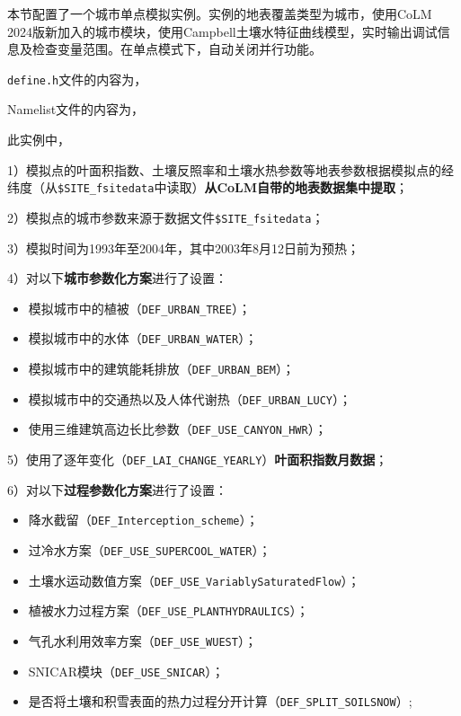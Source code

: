 本节配置了一个城市单点模拟实例。实例的地表覆盖类型为城市，使用CoLM 2024版新加入的城市模块，使用Campbell土壤水特征曲线模型，实时输出调试信息及检查变量范围。在单点模式下，自动关闭并行功能。

\texttt{define.h}文件的内容为，


Namelist文件的内容为，


此实例中，\par
1）模拟点的叶面积指数、土壤反照率和土壤水热参数等地表参数根据模拟点的经纬度（从\texttt{\$SITE\_fsitedata}中读取）\textbf{从CoLM自带的地表数据集中提取}；\par
2）模拟点的城市参数来源于数据文件\texttt{\$SITE\_fsitedata}；\par
3）模拟时间为1993年至2004年，其中2003年8月12日前为预热；\par
4）对以下\textbf{城市参数化方案}进行了设置：
\begin{itemize}[nosep,leftmargin=4em]
    \item 模拟城市中的植被（\texttt{DEF\_URBAN\_TREE}）；
    \item 模拟城市中的水体（\texttt{DEF\_URBAN\_WATER}）；
    \item 模拟城市中的建筑能耗排放（\texttt{DEF\_URBAN\_BEM}）；
    \item 模拟城市中的交通热以及人体代谢热（\texttt{DEF\_URBAN\_LUCY}）；
    \item 使用三维建筑高边长比参数（\texttt{DEF\_USE\_CANYON\_HWR}）；
\end{itemize} \par
5）使用了逐年变化（\texttt{DEF\_LAI\_CHANGE\_YEARLY}）\textbf{叶面积指数月数据}；\par
6）对以下\textbf{过程参数化方案}进行了设置：
\begin{itemize}[nosep,leftmargin=4em]
    \item 降水截留（\texttt{DEF\_Interception\_scheme}）；
    \item 过冷水方案（\texttt{DEF\_USE\_SUPERCOOL\_WATER}）；
    \item 土壤水运动数值方案（\texttt{DEF\_USE\_VariablySaturatedFlow}）；
    \item 植被水力过程方案（\texttt{DEF\_USE\_PLANTHYDRAULICS}）；
    \item 气孔水利用效率方案（\texttt{DEF\_USE\_WUEST}）；
    \item SNICAR模块（\texttt{DEF\_USE\_SNICAR}）；
    \item 是否将土壤和积雪表面的热力过程分开计算（\texttt{DEF\_SPLIT\_SOILSNOW}）;
\end{itemize}
